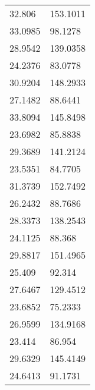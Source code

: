 \documentclass[bwprint]{gmcmthesis}
\begin{document}
\begin{longtable}{ll}
32.806            & 153.1011           \\
33.0985           & 98.1278            \\
28.9542           & 139.0358           \\
24.2376           & 83.0778            \\
30.9204           & 148.2933           \\
27.1482           & 88.6441            \\
33.8094           & 145.8498           \\
23.6982           & 85.8838            \\
29.3689           & 141.2124           \\
23.5351           & 84.7705            \\
31.3739           & 152.7492           \\
26.2432           & 88.7686            \\
28.3373           & 138.2543           \\
24.1125           & 88.368             \\
29.8817           & 151.4965           \\
25.409            & 92.314             \\
27.6467           & 129.4512           \\
23.6852           & 75.2333            \\
26.9599           & 134.9168           \\
23.414            & 86.954             \\
29.6329           & 145.4149           \\
24.6413           & 91.1731            \\ 
\end{longtable}
\end{document}
